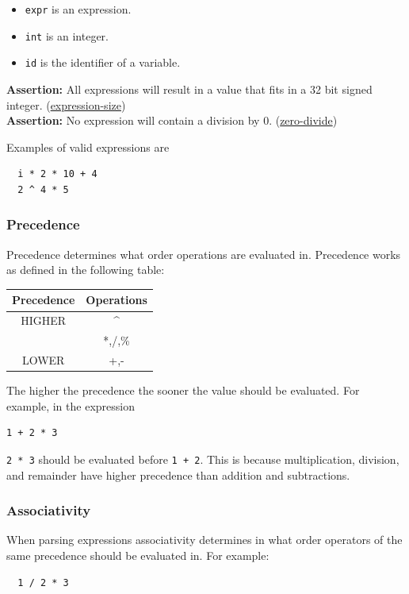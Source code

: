 \documentclass{article}
\newcommand{\code}[1]{\texttt{\textmd{#1}}}
\newcommand{\assertion}[2]{\textbf{Assertion: }#1 (\hyperlink{#2}{#2})}
\begin{document}
\begin{itemize}
  \item \code{expr} is an expression.
  \item \code{int} is an integer.
  \item \code{id} is the identifier of a variable.
\end{itemize}

\assertion{All expressions will result in a value that fits in a 32 bit signed integer.}
{expression-size}\\
\assertion{No expression will contain a division by 0.} {zero-divide}

Examples of valid expressions are
\begin{lstlisting}
  i * 2 * 10 + 4
  2 ^ 4 * 5
\end{lstlisting}

\subsubsection{Precedence}
Precedence determines what order operations are evaluated in. Precedence works as defined in the
following table:
\begin{center}
  \begin{tabular}{|c|c|}
    \hline
    \textbf{Precedence} & \textbf{Operations} \\
    \hline
    HIGHER & \textasciicircum \\
           & *,/,\% \\
    LOWER  & +,- \\
    \hline
  \end{tabular}
\end{center}

The higher the precedence the sooner the value should be evaluated. For example, in the expression
\begin{lstlisting}
1 + 2 * 3
\end{lstlisting}
\code{2 * 3} should be evaluated before \code{1 + 2}. This is because multiplication, division,
and remainder have higher precedence than addition and subtractions.

\subsubsection{Associativity}
When parsing expressions associativity determines in what order operators of the same precedence
should be evaluated in. For example:
\begin{lstlisting}
  1 / 2 * 3
\end{lstlisting}
\end{document}
